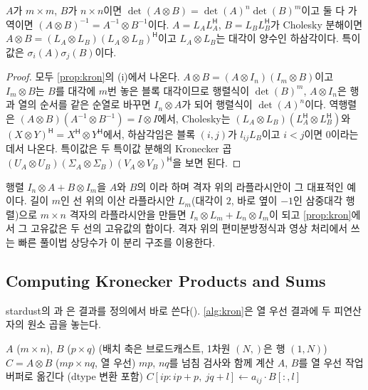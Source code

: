 \begin{proposition}
\label{prop:kron-more}
$A$가 $m\times m$, $B$가 $n\times n$이면 $\det(A\otimes B)=\det(A)^n\det(B)^m$이고 둘 다 가역이면 $(A\otimes B)^{-1}=A^{-1}\otimes B^{-1}$이다. $A=L_AL_A^{\mathsf H}$, $B=L_BL_B^{\mathsf H}$가 Cholesky 분해이면 $A\otimes B=(L_A\otimes L_B)(L_A\otimes L_B)^{\mathsf H}$이고 $L_A\otimes L_B$는 대각이 양수인 하삼각이다. 특이값은 $\sigma_i(A)\sigma_j(B)$이다.
\end{proposition}

\begin{proof}
모두 \cref{prop:kron}의 (i)에서 나온다. $A\otimes B=(A\otimes I_n)(I_m\otimes B)$이고 $I_m\otimes B$는 $B$를 대각에 $m$번 놓은 블록 대각이므로 행렬식이 $\det(B)^m$, $A\otimes I_n$은 행과 열의 순서를 같은 순열로 바꾸면 $I_n\otimes A$가 되어 행렬식이 $\det(A)^n$이다. 역행렬은 $(A\otimes B)(A^{-1}\otimes B^{-1})=I\otimes I$에서, Cholesky는 $(L_A\otimes L_B)(L_A^{\mathsf H}\otimes L_B^{\mathsf H})$와 $(X\otimes Y)^{\mathsf H}=X^{\mathsf H}\otimes Y^{\mathsf H}$에서, 하삼각임은 블록 $(i,j)$가 $l_{ij}L_B$이고 $i<j$이면 $0$이라는 데서 나온다. 특이값은 두 특이값 분해의 Kronecker 곱 $(U_A\otimes U_B)(\Sigma_A\otimes\Sigma_B)(V_A\otimes V_B)^{\mathsf H}$을 보면 된다.
\end{proof}

행렬 $I_n\otimes A+B\otimes I_m$을 $A$와 $B$의 이라 하며 격자 위의 라플라시안이 그 대표적인 예이다. 길이 $m$인 선 위의 이산 라플라시안 $L_m$(대각이 $2$, 바로 옆이 $-1$인 삼중대각 행렬)으로 $m\times n$ 격자의 라플라시안을 만들면 $I_n\otimes L_m+L_n\otimes I_m$이 되고 \cref{prop:kron}에서 그 고유값은 두 선의 고유값의 합이다. 격자 위의 편미분방정식과 영상 처리에서 쓰는 빠른 풀이법 상당수가 이 분리 구조를 이용한다.

\subsection{Computing Kronecker Products and Sums}

stardust의 과 은 결과를 정의에서 바로 쓴다(). \cref{alg:kron}은 열 우선 결과에 두 피연산자의 원소 곱을 놓는다.

\begin{algorithm}[htbp]
\begin{algorithmic}[1]
\Require $A$ ($m\times n$), $B$ ($p\times q$) (배치 축은 브로드캐스트, 1차원 $(N,)$은 행 $(1,N)$)
\Ensure $C=A\otimes B$ ($mp\times nq$, 열 우선)
\State $mp$, $nq$를 넘침 검사와 함께 계산 
\State $A$, $B$를 열 우선 작업 버퍼로 옮긴다 (dtype 변환 포함) 
 
    \State $C[ip:ip+p,\ jq+l]\gets a_{ij}\cdot B[:,l]$ 
  \EndFor
\EndFor
\end{algorithmic}
\caption{Kronecker 곱 (stardust )}
\label{alg:kron}
\end{algorithm}

